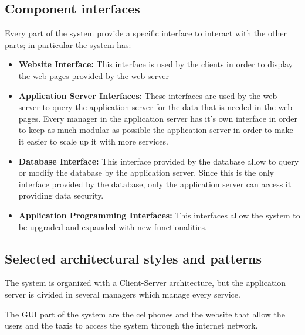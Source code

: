 \subsection{Component interfaces}
	Every part of the system provide a specific interface to interact with the other parts; in particular the system has:
	\begin{itemize}
		\item \textbf{Website Interface:} This interface is used by the clients in order to display the web pages provided by the web server
		\item \textbf{Application Server Interfaces:} These interfaces are used by the web server to query the application server for the data that is needed in the web pages. Every manager in the application server has it's own interface in order to keep as much modular as possible the application server in order to make it easier to scale up it with more services.
		\item \textbf{Database Interface:} This interface provided by the database allow to query or modify the database by the application server. Since this is the only interface provided by the database, only the application server can access it providing data security.
		\item \textbf{Application Programming Interfaces:} This interfaces allow the system to be upgraded and expanded with new functionalities.
	\end{itemize}
\subsection{Selected architectural styles and patterns}
	The system is organized with a Client-Server architecture, but the application server is divided in several managers which manage every service. 
	
	The GUI part of the system are the cellphones and the website that allow the users and the taxis to access the system through the internet network.
	
